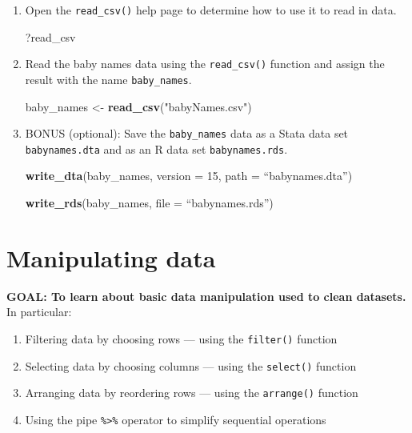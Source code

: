 \documentclass[
]{book}
\newenvironment{Shaded}{\begin{snugshade}}{\end{snugshade}}
\newcommand{\DataTypeTok}[1]{\textcolor[rgb]{0.13,0.29,0.53}{#1}}
\newcommand{\DecValTok}[1]{\textcolor[rgb]{0.00,0.00,0.81}{#1}}
\newcommand{\KeywordTok}[1]{\textcolor[rgb]{0.13,0.29,0.53}{\textbf{#1}}}
\newcommand{\NormalTok}[1]{#1}
\newcommand{\StringTok}[1]{\textcolor[rgb]{0.31,0.60,0.02}{#1}}
\providecommand{\tightlist}{%
  \setlength{\itemsep}{0pt}\setlength{\parskip}{0pt}}
\begin{document}
\begin{enumerate}
\def\labelenumi{\arabic{enumi}.}
\item
  Open the \texttt{read\_csv()} help page to determine how to use it to read in data.

\begin{Shaded}
\begin{Highlighting}[]
\NormalTok{?read\_csv}
\end{Highlighting}
\end{Shaded}
\item
  Read the baby names data using the \texttt{read\_csv()} function and assign the result with the name \texttt{baby\_names}.

\begin{Shaded}
\begin{Highlighting}[]
\NormalTok{baby\_names \textless{}{-}}\StringTok{ }\KeywordTok{read\_csv}\NormalTok{(}\StringTok{"babyNames.csv"}\NormalTok{)}
\end{Highlighting}
\end{Shaded}
\item
  BONUS (optional): Save the \texttt{baby\_names} data as a Stata data set \texttt{babynames.dta} and as an R data set \texttt{babynames.rds}.

\begin{Shaded}
\begin{Highlighting}[]
\KeywordTok{write\_dta}\NormalTok{(baby\_names, }\DataTypeTok{version =} \DecValTok{15}\NormalTok{, }\DataTypeTok{path =}\NormalTok{ “babynames.dta”)}

\KeywordTok{write\_rds}\NormalTok{(baby\_names, }\DataTypeTok{file =}\NormalTok{ “babynames.rds”)}
\end{Highlighting}
\end{Shaded}
\end{enumerate}

\hypertarget{manipulating-data}{%
\section{Manipulating data}\label{manipulating-data}}

\textbf{GOAL: To learn about basic data manipulation used to clean datasets.} In particular:

\begin{enumerate}
\def\labelenumi{\arabic{enumi}.}
\tightlist
\item
  Filtering data by choosing rows --- using the \texttt{filter()} function
\item
  Selecting data by choosing columns --- using the \texttt{select()} function
\item
  Arranging data by reordering rows --- using the \texttt{arrange()} function
\item
  Using the pipe \texttt{\%\textgreater{}\%} operator to simplify sequential operations
\end{enumerate}
\end{document}
